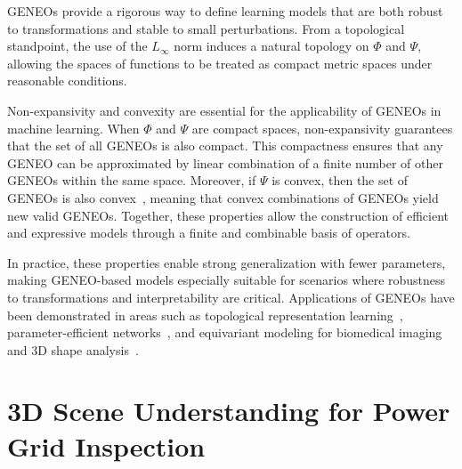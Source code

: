 GENEOs provide a rigorous way to define learning models that are both robust to
transformations and stable to small perturbations. From a topological
standpoint, the use of the $L_\infty$ norm induces a natural topology on $\Phi$
and $\Psi$, allowing the spaces of functions to be treated as compact metric
spaces under reasonable conditions.

Non-expansivity and convexity are essential for the applicability of GENEOs in
machine learning. When $\Phi$ and $\Psi$ are compact spaces, non-expansivity
guarantees that the set of all GENEOs is also compact. This compactness ensures
that any GENEO can be approximated by linear combination of a finite number of 
other GENEOs within the same space. 
%
Moreover, if $\Psi$ is convex, then the set of GENEOs is also
convex~\cite{bergomi2019towards}, meaning that convex combinations of GENEOs
yield new valid GENEOs. Together, these properties allow the construction of
efficient and expressive models through a finite and combinable basis of
operators.

In practice, these properties enable strong generalization with fewer
parameters, making GENEO-based models especially suitable for scenarios where
robustness to transformations and interpretability are critical. Applications
of GENEOs have been demonstrated in areas such as topological representation
learning~\cite{bergomi2019towards}, parameter-efficient
networks~\cite{bocchi2023finite}, and equivariant modeling for biomedical
imaging and 3D shape analysis~\cite{bocchi2022geneonet}.

\section{3D Scene Understanding for Power Grid Inspection}\label{sec:3d_scene_understanding_power_grid}


